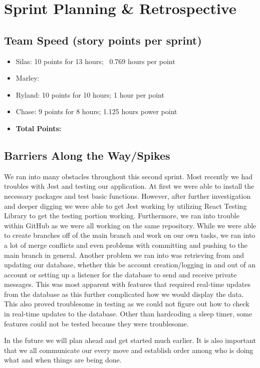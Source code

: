 \section{Sprint Planning \& Retrospective}
\subsection{Team Speed (story points per sprint)}
\begin{itemize}
    \item Silas: 10 points for 13 hours; ~0.769 hours per point
    \item Marley: 
    \item Ryland: 10 points for 10 hours; 1 hour per point
    \item Chase: 9 points for 8 hours; 1.125 hours power point
    \item \textbf{Total Points: }
\end{itemize}

\subsection{Barriers Along the Way/Spikes}
We ran into many obstacles throughout this second sprint. Most recently we had troubles with Jest and testing our application. At first we were able to install the necessary packages and test basic functions. However, after further investigation and deeper digging we were able to get Jest working by utilizing React Testing Library to get the testing portion working. Furthermore, we ran into trouble within GitHub as we were all working on the same repository. While we were able to create branches off of the main branch and work on our own tasks, we ran into a lot of merge conflicts and even problems with committing and pushing to the main branch in general. Another problem we ran into was retrieving from and updating our database, whether this be account creation/logging in and out of an account or setting up a listener for the database to send and receive private messages. This was most apparent with features that required real-time updates from the database as this further complicated how we would display the data. This also proved troublesome in testing as we could not figure out how to check in real-time updates to the database. Other than hardcoding a sleep timer, some features could not be tested because they were troublesome.

In the future we will plan ahead and get started much earlier. It is also important that we all communicate our every move and establish order among who is doing what and when things are being done.